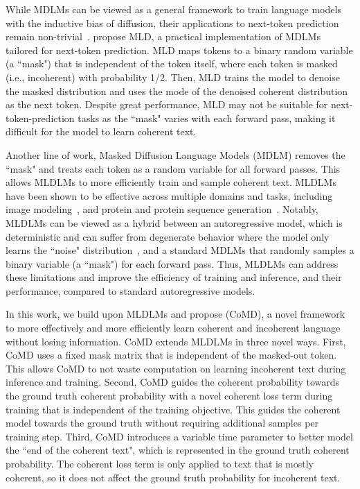 While MDLMs can be viewed as a general framework to train language models with the inductive bias of diffusion, their applications to next-token prediction remain non-trivial~\citep{austin2023structured, shih2022training}. \citet{austin2023structured} propose MLD, a practical implementation of MDLMs tailored for next-token prediction. MLD maps tokens to a binary random variable (a ``mask") that is independent of the token itself, where each token is masked (i.e., incoherent) with probability 1/2. Then, MLD trains the model to denoise the masked distribution and uses the mode of the denoised coherent distribution as the next token. Despite great performance, MLD may not be suitable for next-token-prediction tasks as the ``mask" varies with each forward pass, making it difficult for the model to learn coherent text. 

Another line of work, Masked Diffusion Language Models (MDLM) removes the ``mask" and treats each token as a random variable for all forward passes. This allows MLDLMs to more efficiently train and sample coherent text. MLDLMs have been shown to be effective across multiple domains and tasks, including image modeling~\citep{austin2023structured}, and protein and protein sequence generation~\citep{wang2024diffusion}. Notably, MLDLMs can be viewed as a hybrid between an autoregressive model, which is deterministic and can suffer from degenerate behavior where the model only learns the ``noise" distribution~\citep{hoogeboom2021argmax}, and a standard MDLMs that randomly samples a binary variable (a ``mask") for each forward pass. Thus, MLDLMs can address these limitations and improve the efficiency of training and inference, and their performance, compared to standard autoregressive models. 

In this work, we build upon MLDLMs and propose \ours (CoMD), a novel framework to more effectively and more efficiently learn coherent and incoherent language without losing information. CoMD extends MLDLMs in three novel ways. First, CoMD uses a fixed mask matrix that is independent of the masked-out token. This allows CoMD to not waste computation on learning incoherent text during inference and training. Second, CoMD guides the coherent probability towards the ground truth coherent probability with a novel coherent loss term during training that is independent of the training objective. This guides the coherent model towards the ground truth without requiring additional samples per training step. Third, CoMD introduces a variable time parameter to better model the ``end of the coherent text", which is represented in the ground truth coherent probability. The coherent loss term is only applied to text that is mostly coherent, so it does not affect the ground truth probability for incoherent text. 

